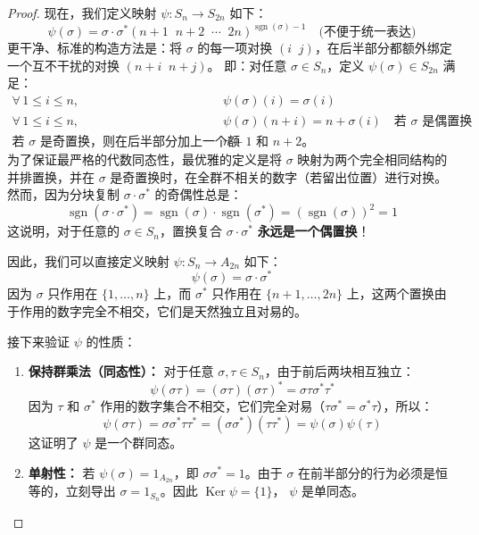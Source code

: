 \documentclass[]{article}
\begin{document}
\begin{proof}
现在，我们定义映射 $\psi: S_n \longrightarrow S_{2n}$ 如下：
\[ \psi(\sigma) = \sigma \cdot \sigma^*(n+1 \;\; n+2 \;\; \cdots \;\; 2n)^{\operatorname{sgn}(\sigma)-1} \quad \text{(不便于统一表达)} \]
更干净、标准的构造方法是：将 $\sigma$ 的每一项对换 $(i \;\; j)$，在后半部分都额外绑定一个互不干扰的对换 $(n+i \;\; n+j)$。
即：对任意 $\sigma \in S_n$，定义 $\psi(\sigma) \in S_{2n}$ 满足：
\begin{align*}
	\forall \, 1 \le i \le n, \quad & \psi(\sigma)(i) = \sigma(i) \\
	\forall \, 1 \le i \le n, \quad & \psi(\sigma)(n+i) = n + \sigma(i) \quad \text{若 } \sigma \text{ 是偶置换} \\
	\text{若 } \sigma \text{ 是奇置换，则在后半部分加上一个额外的对换，例如交换 } & n+1 \text{ 和 } n+2\text{。}
\end{align*}
为了保证最严格的代数同态性，最优雅的定义是将 $\sigma$ 映射为两个完全相同结构的并排置换，并在 $\sigma$ 是奇置换时，在全群不相关的数字（若留出位置）进行对换。然而，因为分块复制 $\sigma \cdot \sigma^*$ 的奇偶性总是：
\[ \operatorname{sgn}(\sigma \cdot \sigma^*) = \operatorname{sgn}(\sigma) \cdot \operatorname{sgn}(\sigma^*) = (\operatorname{sgn}(\sigma))^2 = 1 \]
这说明，对于任意的 $\sigma \in S_n$，置换复合 $\sigma \cdot \sigma^*$ \textbf{永远是一个偶置换}！

因此，我们可以直接定义映射 $\psi: S_n \longrightarrow A_{2n}$ 如下：
\[ \psi(\sigma) = \sigma \cdot \sigma^* \]
因为 $\sigma$ 只作用在 $\{1, \dots, n\}$ 上，而 $\sigma^*$ 只作用在 $\{n+1, \dots, 2n\}$ 上，这两个置换由于作用的数字完全不相交，它们是天然独立且对易的。

接下来验证 $\psi$ 的性质：
\begin{enumerate}
	\item \textbf{保持群乘法（同态性）：}
	对于任意 $\sigma, \tau \in S_n$，由于前后两块相互独立：
	\[ \psi(\sigma\tau) = (\sigma\tau)(\sigma\tau)^* = \sigma\tau\sigma^*\tau^* \]
	因为 $\tau$ 和 $\sigma^*$ 作用的数字集合不相交，它们完全对易（$\tau\sigma^* = \sigma^*\tau$），所以：
	\[ \psi(\sigma\tau) = \sigma\sigma^*\tau\tau^* = (\sigma\sigma^*)(\tau\tau^*) = \psi(\sigma)\psi(\tau) \]
	这证明了 $\psi$ 是一个群同态。
	
	\item \textbf{单射性：}
	若 $\psi(\sigma) = 1_{A_{2n}}$，即 $\sigma\sigma^* = 1$。由于 $\sigma$ 在前半部分的行为必须是恒等的，立刻导出 $\sigma = 1_{S_n}$。因此 $\operatorname{Ker}\psi = \{1\}$， $\psi$ 是单同态。
\end{enumerate}


\end{proof}
\end{document}
